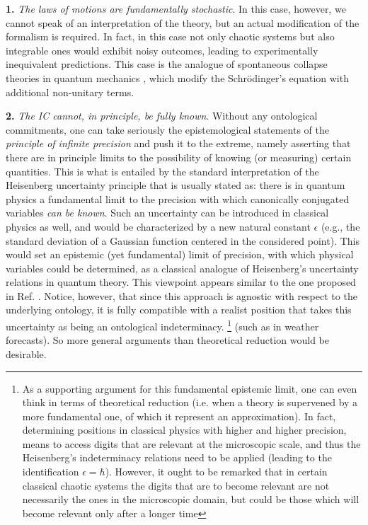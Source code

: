 \documentclass[aps,prl,twocolumn,showpacs,superscriptaddress,groupedaddress, nofootinbib]{revtex4-1}
\begin{document}
\textbf{1.} \emph{The laws of motions are fundamentally stochastic}. In this case, however, we cannot speak of an interpretation of the theory, but an actual modification of the formalism is required. In fact, in this case not only chaotic systems but also integrable ones would exhibit noisy outcomes, leading to experimentally inequivalent predictions. This case is the analogue of spontaneous collapse theories in quantum mechanics \cite{grw, gisincollapse, belljumps, cls}, which modify the Schr{\"o}dinger's equation with additional non-unitary terms.

\textbf{2.} \emph{The IC cannot, in principle, be fully known}. Without any ontological commitments, one can take seriously the epistemological statements of the \emph{principle of infinite precision} and push it to the extreme, namely asserting that there are in principle limits to the possibility of knowing (or measuring) certain quantities. This is what is entailed by the standard interpretation of the Heisenberg uncertainty principle that is usually stated as: there is in quantum physics a fundamental limit to the precision with which canonically conjugated variables \emph{can be known}.  Such an uncertainty can be introduced in classical physics as well, and would be characterized by a new natural constant $\epsilon$ (e.g., the standard deviation of a Gaussian function centered in the considered point). This would set an epistemic (yet fundamental) limit of precision, with which physical variables could be determined, as a classical analogue of  Heisenberg's uncertainty relations in quantum theory. This viewpoint appears similar to the one proposed in Ref. \cite{drossel}. Notice, however, that since this approach is agnostic with respect to the underlying ontology, it is fully compatible with a realist position that takes this uncertainty as being an ontological indeterminacy.
\footnote{As a supporting argument for this fundamental epistemic limit, one can even think in terms of theoretical reduction (i.e. when a theory is supervened by a more fundamental one, of which it represent an approximation). In fact, determining positions in classical physics with higher and higher precision, means to access digits that are relevant at the microscopic scale, and thus the Heisenberg's indeterminacy relations need to be applied (leading to the identification $\epsilon=\hbar$). However, it ought to be remarked that in certain classical chaotic systems the digits that are to become relevant are not necessarily the ones in the microscopic domain, but could be those which will become relevant only after a longer time} (such as in weather forecasts). So more general arguments than theoretical reduction would be desirable.
\end{document}
